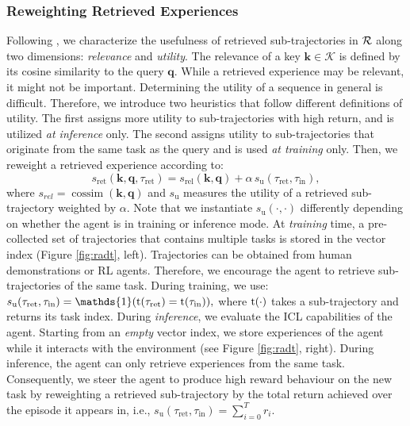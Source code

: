 \documentclass{article}
\newcommand\Bk{\bm{k}}
\newcommand\Bq{\bm{q}}
\newcommand{\cK}{\mathcal{K}} \newcommand{\cL}{\mathcal{L}}
\begin{document}
\subsubsection{Reweighting Retrieved Experiences} \label{sec:reweighting}
Following \citet{Park:23}, we characterize the usefulness of retrieved sub-trajectories in $\mathcal{R}$ along two dimensions: \textit{relevance} and \textit{utility}.
The relevance of a key $\Bk \in \cK$ is defined by its cosine similarity to the query $\Bq$.
While a retrieved experience may be relevant, it might not be important.
Determining the utility of a sequence in general is difficult.
Therefore, we introduce two heuristics that follow different definitions of utility.
The first assigns more utility to sub-trajectories with high return, and is utilized \emph{at inference} only.
The second assigns utility to sub-trajectories that originate from the same task as the query and is used \emph{at training} only.
Then, we reweight a retrieved experience according to:
\begin{equation}\label{eq:retscore}
    s_{\text{ret}}(\Bk, \Bq, \tau_{\text{ret}}) = s_{\text{rel}}(\Bk, \Bq) + \alpha\, s_{\text{u}}(\tau_{\text{ret}}, \tau_{\text{in}}),
\end{equation}
where $s_{rel}=\operatorname{cossim} (\Bk, \Bq)$ and $s_{\text{u}}$ measures the utility of a retrieved sub-trajectory weighted by $\alpha$.
Note that we instantiate $s_{\text{u}}(\cdot,\cdot)$ differently depending on whether the agent is in training or inference mode.
At \emph{training} time, a pre-collected set of trajectories that contains multiple tasks is stored in the vector index (Figure \ref{fig:radt}, left). Trajectories can be obtained from human demonstrations or RL agents.
Therefore, we encourage the agent to retrieve sub-trajectories of the same task. During training, we use:
$
    s_{\text{u}}(\tau_{\text{ret}},\tau_{\text{in}}) = \mathds{1}(\Rt(\tau_{\text{ret}}) = \Rt(\tau_{\text{in}})),
$
where $\mathrm{t}(\cdot)$ takes a sub-trajectory and returns its task index.
During \emph{inference}, we evaluate the ICL capabilities of the agent.
Starting from an \emph{empty} vector index, we store experiences of the agent while it interacts with the environment (see Figure \ref{fig:radt}, right).
During inference, the agent can only retrieve experiences from the same task.
Consequently, we steer the agent to produce high reward behaviour on the new task by reweighting a retrieved sub-trajectory by the total return achieved over the episode it appears in, i.e., $s_{\text{u}}(\tau_{\text{ret}}, \tau_{\text{in}}) = \sum_{i=0}^T r_i$.
\end{document}
